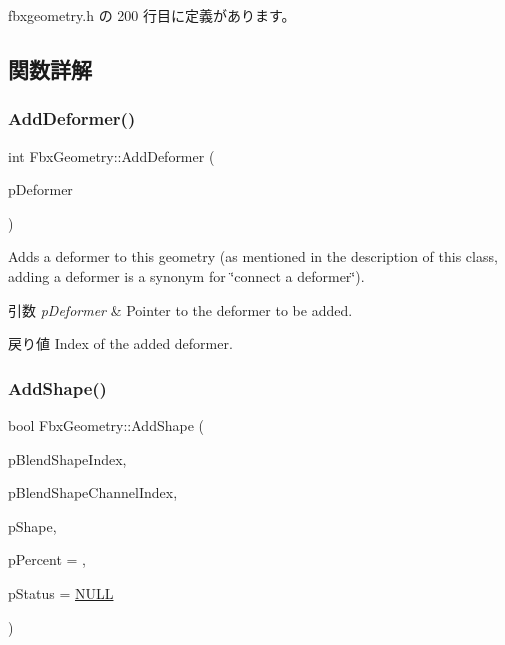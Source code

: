  fbxgeometry.\+h の 200 行目に定義があります。



\subsection{関数詳解}
\mbox{\label{class_fbx_geometry_a2f7e48a2faaf3893bc28eb8b684da908}} 
\subsubsection{\texorpdfstring{Add\+Deformer()}{AddDeformer()}}
{\footnotesize\ttfamily int Fbx\+Geometry\+::\+Add\+Deformer (\begin{DoxyParamCaption}\item[{\hyperlink{class_fbx_deformer}{Fbx\+Deformer} $\ast$}]{p\+Deformer }\end{DoxyParamCaption})}

Adds a deformer to this geometry (as mentioned in the description of this class, adding a deformer is a synonym for \char`\"{}connect a deformer\char`\"{}). 
\begin{DoxyParams}{引数}
{\em p\+Deformer} & Pointer to the deformer to be added. \\
\hline
\end{DoxyParams}
\begin{DoxyReturn}{戻り値}
Index of the added deformer. 
\end{DoxyReturn}
\mbox{\label{class_fbx_geometry_a4b9464c1f35f6bad8f2f19e427e70c9f}} 
\subsubsection{\texorpdfstring{Add\+Shape()}{AddShape()}}
{\footnotesize\ttfamily bool Fbx\+Geometry\+::\+Add\+Shape (\begin{DoxyParamCaption}\item[{int}]{p\+Blend\+Shape\+Index,  }\item[{int}]{p\+Blend\+Shape\+Channel\+Index,  }\item[{\hyperlink{class_fbx_shape}{Fbx\+Shape} $\ast$}]{p\+Shape,  }\item[{double}]{p\+Percent = {},  }\item[{\hyperlink{class_fbx_status}{Fbx\+Status} $\ast$}]{p\+Status = {\ttfamily \hyperlink{fbxarch_8h_a070d2ce7b6bb7e5c05602aa8c308d0c4}{N\+U\+LL}} }\end{DoxyParamCaption})}

